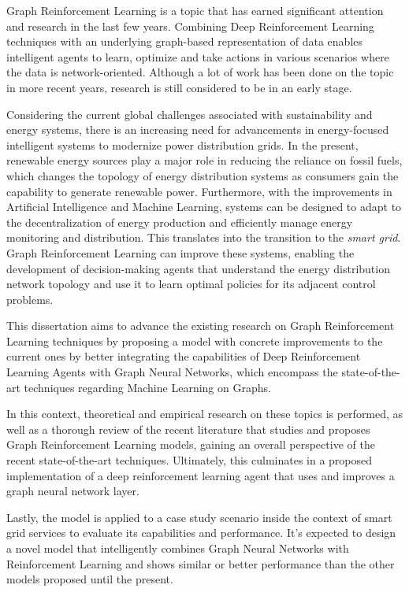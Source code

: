 Graph Reinforcement Learning is a topic that has earned significant attention and research in the last few years. Combining Deep Reinforcement Learning techniques with an underlying graph-based representation of data enables intelligent agents to learn, optimize and take actions in various scenarios where the data is network-oriented. Although a lot of work has been done on the topic in more recent years, research is still considered to be in an early stage. \par
Considering the current global challenges associated with sustainability and energy systems, there is an increasing need for advancements in energy-focused intelligent systems to modernize power distribution grids. In the present, renewable energy sources play a major role in reducing the reliance on fossil fuels, which changes the topology of energy distribution systems as consumers gain the capability to generate renewable power. Furthermore, with the improvements in Artificial Intelligence and Machine Learning, systems can be designed to adapt to the decentralization of energy production and efficiently manage energy monitoring and distribution. This translates into the transition to the \textit{smart grid}. Graph Reinforcement Learning can improve these systems, enabling the development of decision-making agents that understand the energy distribution network topology and use it to learn optimal policies for its adjacent control problems. \par
This dissertation aims to advance the existing research on Graph Reinforcement Learning techniques by proposing a model with concrete improvements to the current ones by better integrating the capabilities of Deep Reinforcement Learning Agents with Graph Neural Networks, which encompass the state-of-the-art techniques regarding Machine Learning on Graphs. \par
In this context, theoretical and empirical research on these topics is performed, as well as a thorough review of the recent literature that studies and proposes Graph Reinforcement Learning models,  gaining an overall perspective of the recent state-of-the-art techniques. Ultimately, this culminates in a proposed implementation of a deep reinforcement learning agent that uses and improves a graph neural network layer. \par
Lastly, the model is applied to a case study scenario inside the context of smart grid services to evaluate its capabilities and performance. It's expected to design a novel model that intelligently combines Graph Neural Networks with Reinforcement Learning and shows similar or better performance than the other models proposed until the present.
\\

